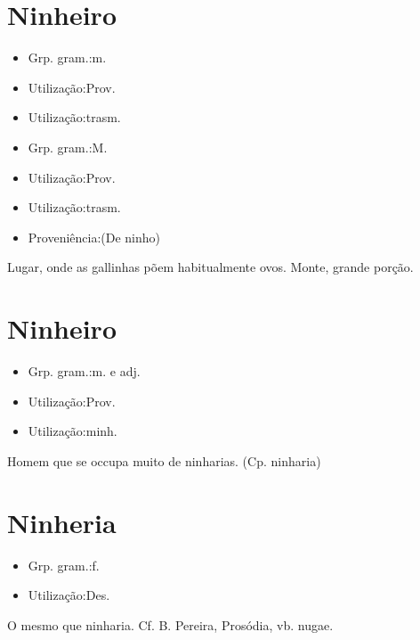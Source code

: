 \section{Ninheiro}
\begin{itemize}
\item {Grp. gram.:m.}
\end{itemize}
\begin{itemize}
\item {Utilização:Prov.}
\end{itemize}
\begin{itemize}
\item {Utilização:trasm.}
\end{itemize}
\begin{itemize}
\item {Grp. gram.:M.}
\end{itemize}
\begin{itemize}
\item {Utilização:Prov.}
\end{itemize}
\begin{itemize}
\item {Utilização:trasm.}
\end{itemize}
\begin{itemize}
\item {Proveniência:(De \textunderscore ninho\textunderscore )}
\end{itemize}
Lugar, onde as gallinhas põem habitualmente ovos.
Monte, grande porção.
\section{Ninheiro}
\begin{itemize}
\item {Grp. gram.:m.  e  adj.}
\end{itemize}
\begin{itemize}
\item {Utilização:Prov.}
\end{itemize}
\begin{itemize}
\item {Utilização:minh.}
\end{itemize}
Homem que se occupa muito de ninharias.
(Cp. \textunderscore ninharia\textunderscore )
\section{Ninheria}
\begin{itemize}
\item {Grp. gram.:f.}
\end{itemize}
\begin{itemize}
\item {Utilização:Des.}
\end{itemize}
O mesmo que \textunderscore ninharia\textunderscore . Cf. B. Pereira, \textunderscore Prosódia\textunderscore , vb. \textunderscore nugae\textunderscore .
